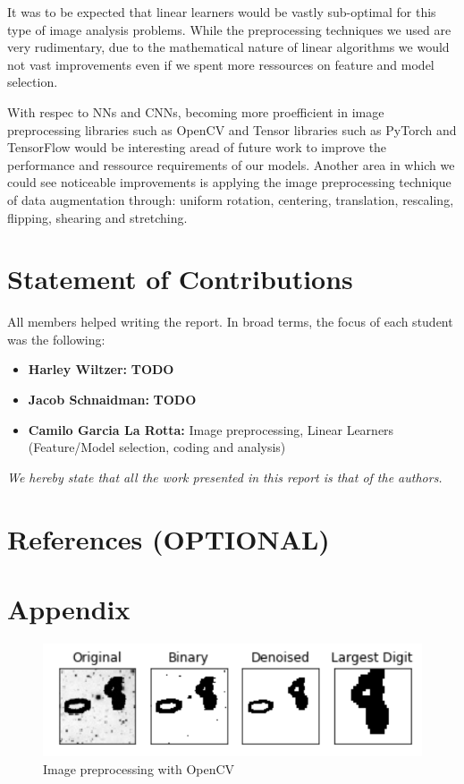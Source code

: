 \documentclass[10pt, hidelinks]{article}
\begin{document}
It was to be expected that linear learners would be vastly sub-optimal for this type of image analysis problems. While the preprocessing techniques we used are very rudimentary, due to the mathematical nature of linear algorithms we would not vast improvements even if we spent more ressources on feature and model selection.

\noindent With respec to NNs and CNNs, becoming more proefficient in image preprocessing libraries such as OpenCV and Tensor libraries such as PyTorch and TensorFlow would be interesting aread of future work to improve the performance and ressource requirements of our models. Another area in which we could see noticeable improvements is applying the image preprocessing technique of data augmentation through: uniform rotation, centering, translation, rescaling, flipping, shearing and stretching. 


\section*{Statement of Contributions}

All members helped writing the report. In broad terms, the focus of each student was the following:

\begin{itemize}
    \item \textbf{Harley Wiltzer:} \textbf{TODO}
    \item \textbf{Jacob Schnaidman:} \textbf{TODO}
    \item \textbf{Camilo Garcia La Rotta:} Image preprocessing, Linear Learners (Feature/Model selection, coding and analysis)
\end{itemize}

\textit{We hereby state that all the work presented in this report is that of the authors.}

\section*{References (OPTIONAL)}


\section*{Appendix}

\begin{figure}[h]
    \centering
    \includegraphics[width=\textwidth]{preprocessing}
    \caption{Image preprocessing with OpenCV}
    \label{preprocessing}
\end{figure}
\end{document}
